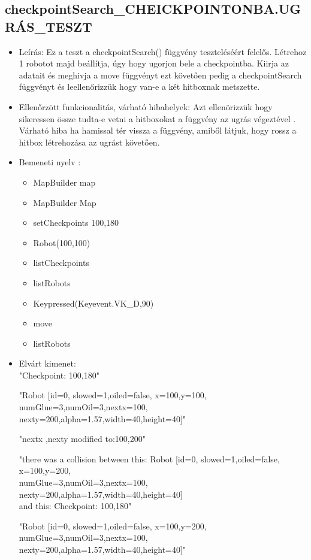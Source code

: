 \subsection{checkpointSearch\_CHEICKPOINTONBA.UGRÁS\_TESZT}
\begin{itemize}
	\item Leírás: Ez a teszt a checkpointSearch() függvény teszteléséért felelős.
			Létrehoz 1 robotot majd beállítja, úgy hogy ugorjon bele a checkpointba.
			Kiirja az adatait  és meghivja a move függvényt ezt követően pedig a checkpointSearch függvényt és leellenőrizzük hogy van-e a két hitboxnak metszette.\newline
	\item Ellenőrzött funkcionalitás, várható hibahelyek: Azt ellenörizzük hogy sikeressen össze tudta-e vetni a hitboxokat a függvény az ugrás                     végeztével .
	        Várható hiba ha hamissal tér vissza a függvény, amiből látjuk, hogy rossz a hitbox létrehozása  az ugrást követően.
	\item Bemeneti nyelv :
		\begin{itemize}
\item MapBuilder map
        \item MapBuilder Map
        \item setCheckpoints 100,180
		\item Robot(100,100)
		\item listCheckpoints
		\item listRobots
		\item Keypressed(Keyevent.VK\_D,90)
		\item move
		\item listRobots
		\end{itemize}

	\item Elvárt kimenet: \\
	    "Checkpoint: 100,180"\newline
	    
		"Robot [id=0,  slowed=1,oiled=false, x=100,y=100, 
		\\numGlue=3,numOil=3,nextx=100,
		\\nexty=200,alpha=1.57,width=40,height=40]"\newline
		
		"nextx ,nexty modified to:100,200"\newline
		
		 "there was a collision between this: Robot [id=0,  slowed=1,oiled=false, x=100,y=200, 
		\\numGlue=3,numOil=3,nextx=100,
		\\nexty=200,alpha=1.57,width=40,height=40]
		\\and this: 
		  Checkpoint: 100,180"\newline
	
		 "Robot [id=0,  slowed=1,oiled=false, x=100,y=200, 
		\\numGlue=3,numOil=3,nextx=100,
		\\nexty=200,alpha=1.57,width=40,height=40]"\newline
	
\end{itemize}

